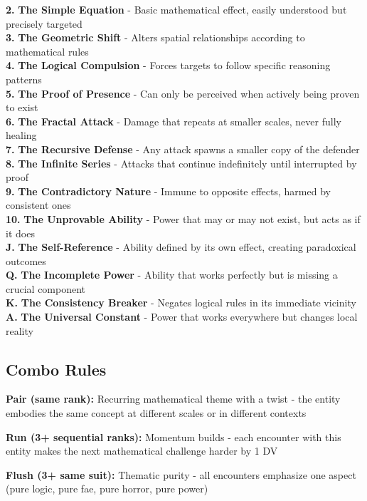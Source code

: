 \documentclass[11pt]{article}
\begin{document}
\textbf{2.} \textbf{The Simple Equation} - Basic mathematical effect, easily understood but precisely targeted \\
\textbf{3.} \textbf{The Geometric Shift} - Alters spatial relationships according to mathematical rules \\
\textbf{4.} \textbf{The Logical Compulsion} - Forces targets to follow specific reasoning patterns \\
\textbf{5.} \textbf{The Proof of Presence} - Can only be perceived when actively being proven to exist \\
\textbf{6.} \textbf{The Fractal Attack} - Damage that repeats at smaller scales, never fully healing \\
\textbf{7.} \textbf{The Recursive Defense} - Any attack spawns a smaller copy of the defender \\
\textbf{8.} \textbf{The Infinite Series} - Attacks that continue indefinitely until interrupted by proof \\
\textbf{9.} \textbf{The Contradictory Nature} - Immune to opposite effects, harmed by consistent ones \\
\textbf{10.} \textbf{The Unprovable Ability} - Power that may or may not exist, but acts as if it does \\
\textbf{J.} \textbf{The Self-Reference} - Ability defined by its own effect, creating paradoxical outcomes \\
\textbf{Q.} \textbf{The Incomplete Power} - Ability that works perfectly but is missing a crucial component \\
\textbf{K.} \textbf{The Consistency Breaker} - Negates logical rules in its immediate vicinity \\
\textbf{A.} \textbf{The Universal Constant} - Power that works everywhere but changes local reality

\subsection*{Combo Rules}

\textbf{Pair (same rank):} Recurring mathematical theme with a twist - the entity embodies the same concept at different scales or in different contexts

\textbf{Run (3+ sequential ranks):} Momentum builds - each encounter with this entity makes the next mathematical challenge harder by 1 DV

\textbf{Flush (3+ same suit):} Thematic purity - all encounters emphasize one aspect (pure logic, pure fae, pure horror, pure power)
\end{document}
